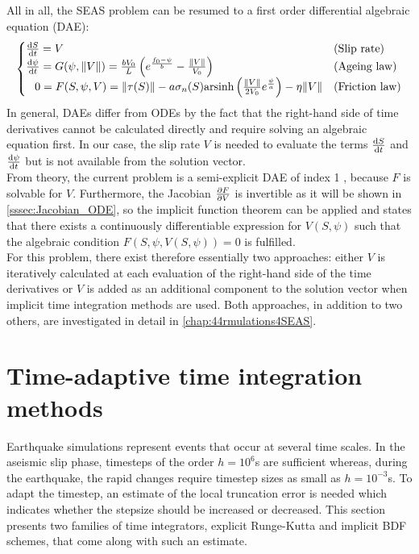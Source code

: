 All in all, the SEAS problem can be resumed to a first order differential algebraic equation (DAE):
\begin{align}
	\label{eq:GeneralSEASDAE}
	\begin{cases}
		\dv{S}{t} = V  & \text{(Slip rate)} \\
		\dv{\psi}{t} = G(\psi, \norm{V}) = \frac{bV_0}{L}\left(e^{\frac{f_0 - \psi}{b}} - \frac{\norm{V}}{V_0}\right) & \text{(Ageing law)} \\
		\;\,\ 0 = F(S,\psi,V) = \norm{\tau(S)} - a \sigma_n(S) \text{arsinh}\left(\frac{\norm{V}}{2V_0}e^{\frac{\psi}{a}}\right) - \eta \norm{V} & \text{(Friction law)}
	\end{cases}	
\end{align}
In general, DAEs differ from ODEs by the fact that the right-hand side of time derivatives cannot be calculated directly and require solving an algebraic equation first. In our case, the slip rate $V$ is needed to evaluate the terms $\dv{S}{t}$ and $\dv{\psi}{t}$ but is not available from the solution vector. \\
From theory, the current problem is a semi-explicit DAE of index 1 \cite[p. 168]{DAETheory}, because $F$ is solvable for $V$. Furthermore, the Jacobian $\pdv{F}{V}$ is invertible as it will be shown in \autoref{sssec:Jacobian_ODE}, so the implicit function theorem can be applied and states that there exists a continuously differentiable expression for $V(S,\psi)$ such that the algebraic condition $F(S,\psi,V(S,\psi))=0$ is fulfilled. \\
For this problem, there exist therefore essentially two approaches: either $V$ is iteratively calculated at each evaluation of the right-hand side of the time derivatives or $V$ is added as an additional component to the solution vector when implicit time integration methods are used. Both approaches, in addition to two others, are investigated in detail in \autoref{chap:44rmulations4SEAS}. \\


\section{Time-adaptive time integration methods}
\label{sec:Theory_TimeIntegration}
Earthquake simulations represent events that occur at several time scales. In the aseismic slip phase, timesteps of the order $h=10^6$s are sufficient whereas, during the earthquake, the rapid changes require timestep sizes as small as $h=10^{-3}$s. To adapt the timestep, an estimate of the local truncation error is needed which indicates whether the stepsize should be increased or decreased. This section presents two families of time integrators, explicit Runge-Kutta and implicit BDF schemes, that come along with such an estimate.

